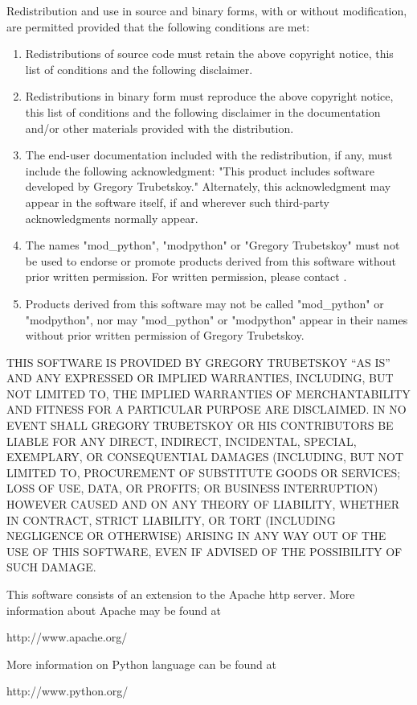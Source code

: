 \centerline{}

Redistribution and use in source and binary forms, with or without
modification, are permitted provided that the following conditions
are met:

\begin{enumerate}

\item
Redistributions of source code must retain the above copyright
notice, this list of conditions and the following disclaimer. 

\item
Redistributions in binary form must reproduce the above copyright
notice, this list of conditions and the following disclaimer in the
documentation and/or other materials provided with the distribution.

\item
The end-user documentation included with the redistribution, if any,
must include the following acknowledgment: "This product includes
software developed by Gregory Trubetskoy." Alternately, this
acknowledgment may appear in the software itself, if and wherever such
third-party acknowledgments normally appear.

\item
The names "mod_python", "modpython" or "Gregory Trubetskoy" must not 
be used to endorse or promote products derived from this software 
without prior written permission. For written permission, please 
contact .

\item
Products derived from this software may not be called "mod_python"
or "modpython", nor may "mod_python" or "modpython" appear in their 
names without prior written permission of Gregory Trubetskoy.

\end{enumerate}

THIS SOFTWARE IS PROVIDED BY GREGORY TRUBETSKOY ``AS IS'' AND ANY
EXPRESSED OR IMPLIED WARRANTIES, INCLUDING, BUT NOT LIMITED TO, THE
IMPLIED WARRANTIES OF MERCHANTABILITY AND FITNESS FOR A PARTICULAR
PURPOSE ARE DISCLAIMED.  IN NO EVENT SHALL GREGORY TRUBETSKOY OR
HIS CONTRIBUTORS BE LIABLE FOR ANY DIRECT, INDIRECT, INCIDENTAL,
SPECIAL, EXEMPLARY, OR CONSEQUENTIAL DAMAGES (INCLUDING, BUT
NOT LIMITED TO, PROCUREMENT OF SUBSTITUTE GOODS OR SERVICES;
LOSS OF USE, DATA, OR PROFITS; OR BUSINESS INTERRUPTION)
HOWEVER CAUSED AND ON ANY THEORY OF LIABILITY, WHETHER IN CONTRACT,
STRICT LIABILITY, OR TORT (INCLUDING NEGLIGENCE OR OTHERWISE)
ARISING IN ANY WAY OUT OF THE USE OF THIS SOFTWARE, EVEN IF ADVISED
OF THE POSSIBILITY OF SUCH DAMAGE.

This software consists of an extension to the Apache http server.
More information about Apache may be found at

http://www.apache.org/

More information on Python language can be found at

http://www.python.org/

